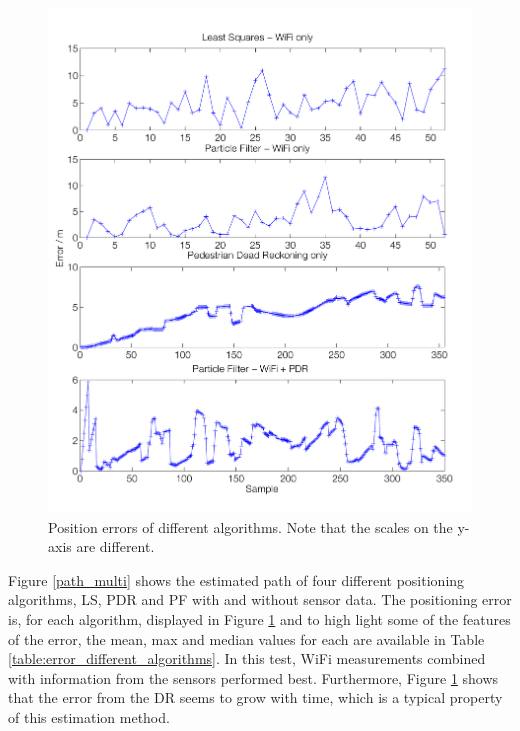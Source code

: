 \documentclass{LTHthesis}
\begin{document}
%
\begin{figure}[!hbt]

\includegraphics[width=1\textwidth ]{images/sensor_fused/error_multi}
\caption{Position errors of different algorithms. Note that the scales on the y-axis are different.}\label{error_multi}
\end{figure}
%
Figure \ref{path_multi} shows the estimated path of four different positioning algorithms, LS, PDR and PF with and without sensor data. The positioning error is, for each algorithm, displayed in Figure \ref{error_multi} and to high light some of the features of the error, the mean, max and median values for each are available in Table \ref{table:error_different_algorithms}. In this test, WiFi measurements combined with information from the sensors performed best. Furthermore, Figure \ref{error_multi} shows that the error from the DR seems to grow with time, which is a typical property of this estimation method. 
%
\end{document}
